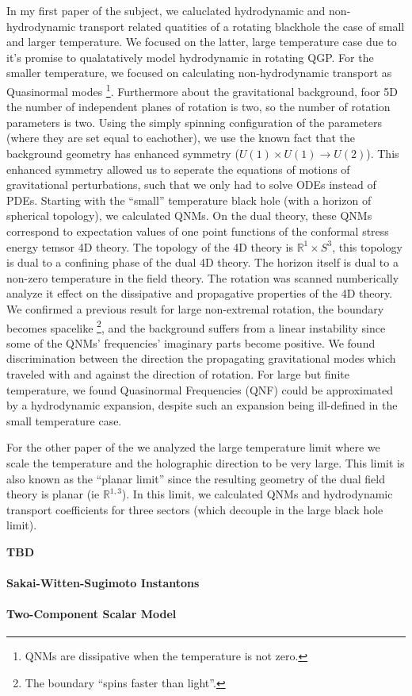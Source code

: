 \documentclass[12pt]{article}
\begin{document}
In my first paper of the subject, we caluclated hydrodynamic and non-hydrodynamic transport related quatities of a rotating blackhole the case of small and larger temperature.
We focused on the latter, large temperature case due to it's promise to qualatatively model hydrodynamic in rotating QGP.
For the smaller temperature, we focused on calculating non-hydrodynamic transport as Quasinormal modes
  \footnote{QNMs are dissipative when the temperature is not zero.}.
Furthermore about the gravitational background, foor 5D the number of independent planes of rotation is two, so the number of rotation parameters is two.
Using the simply spinning configuration of the parameters (where they are set equal to eachother), we use the known fact that the background geometry has enhanced symmetry ($U(1)\times U(1) \rightarrow U(2)$).
This enhanced symmetry allowed us to seperate the equations of motions of gravitational perturbations, such that we only had to solve ODEs instead of PDEs.
Starting with the ``small'' temperature black hole (with a horizon of spherical topology), we calculated QNMs.
On the dual theory, these QNMs correspond to expectation values of one point functions of the conformal stress energy temsor 4D theory.
The topology of the 4D theory is $\mathds{R}^1 \times S^3$, this topology is dual to a confining phase of the dual 4D theory.
The horizon itself is dual to a non-zero temperature in the field theory.
The rotation was scanned numberically analyze it effect on the dissipative and propagative properties of the 4D theory.
We confirmed a previous result for large non-extremal rotation, the boundary becomes spacelike
  \footnote{The boundary ``spins faster than light''.}, 
and the background suffers from a linear instability since some of the QNMs' frequencies' imaginary parts become positive.
We found discrimination between the direction the propagating gravitational modes which traveled with and against the direction of rotation.
For large but finite temperature, we found Quasinormal Frequencies (QNF) could be approximated by a hydrodynamic expansion, despite such an expansion being ill-defined in the small temperature case.

For the other paper of the we analyzed the large temperature limit where we scale the temperature and the holographic direction to be very large.
This limit is also known as the ``planar limit'' since the resulting geometry of the dual field theory is planar (ie $\mathds{R}^{1,3}$).
In this limit, we calculated QNMs and hydrodynamic transport coefficients for three sectors (which decouple in the large black hole limit).

\bf{TBD}

\paragraph{Sakai-Witten-Sugimoto Instantons}


\paragraph{Two-Component Scalar Model}

\end{document}
